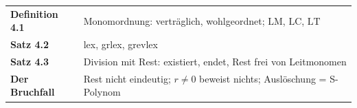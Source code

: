 \begin{merksatz}
\begin{center}
\renewcommand{\arraystretch}{1.5}
\begin{tabular}{@{}P{3.0cm}P{5.6cm}@{}}
\toprule
\textbf{Definition 4.1} & Monomordnung: verträglich, wohlgeordnet; $\mathrm{LM}$, $\mathrm{LC}$, $\mathrm{LT}$\\
\textbf{Satz 4.2} & lex, grlex, grevlex\\
\textbf{Satz 4.3} & Division mit Rest: existiert, endet, Rest frei von Leitmonomen\\
\textbf{Der Bruchfall} & Rest nicht eindeutig; $r\ne0$ beweist nichts; Auslöschung = S-Polynom\\
\bottomrule
\end{tabular}
\end{center}

\begin{center}
\begin{minipage}{0.88\textwidth}
\end{minipage}
\end{center}
\end{merksatz}
